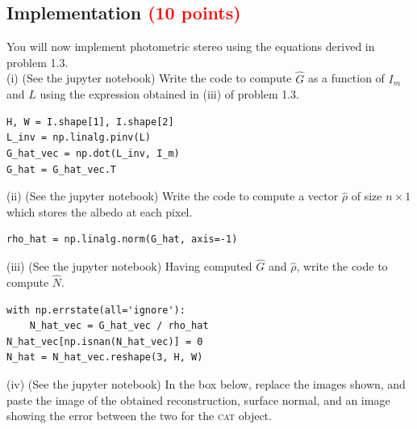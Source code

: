 \documentclass[answers]{exam}
\newcommand{\mypoints}[1]{\textcolor{red}{(#1 points)}}
\begin{document}
\subsection{Implementation \mypoints{10}}
You will now implement photometric stereo using the equations derived in problem 1.3. \\

(i) (See the jupyter notebook) Write the code to compute $\hat{G}$ as a function of $I_m$ and $L$ using the expression obtained in (iii) of problem 1.3. 
\begin{solution}
\begin{verbatim}
H, W = I.shape[1], I.shape[2]
L_inv = np.linalg.pinv(L)
G_hat_vec = np.dot(L_inv, I_m)
G_hat = G_hat_vec.T
\end{verbatim}

\end{solution}

(ii) (See the jupyter notebook) Write the code to compute a vector $\hat{\rho}$ of size $n \times 1$ which stores the albedo at each pixel. 
\begin{solution}
\begin{verbatim}
rho_hat = np.linalg.norm(G_hat, axis=-1)
\end{verbatim}
\end{solution}

(iii) (See the jupyter notebook) Having computed $\hat{G}$ and $\hat{\rho}$, write the code to compute $\hat{N}$. 
\begin{solution} 
\begin{verbatim}
with np.errstate(all='ignore'):
    N_hat_vec = G_hat_vec / rho_hat
N_hat_vec[np.isnan(N_hat_vec)] = 0
N_hat = N_hat_vec.reshape(3, H, W)
\end{verbatim}
\end{solution}
(iv) (See the jupyter notebook) In the box below, replace the images shown, and paste the image of the obtained reconstruction, surface normal, and an image showing the error between the two for the \textsc{cat} object. 
\end{document}
